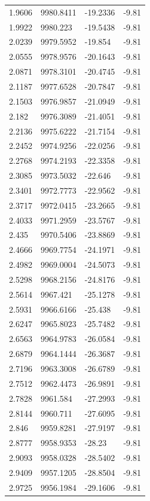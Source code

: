 \begin{table}[H]
\begin{tabular}{llll}
1.9606 & 9980.8411 & -19.2336 & -9.81 \\
1.9922 & 9980.223 & -19.5438 & -9.81 \\
2.0239 & 9979.5952 & -19.854 & -9.81 \\
2.0555 & 9978.9576 & -20.1643 & -9.81 \\
2.0871 & 9978.3101 & -20.4745 & -9.81 \\
2.1187 & 9977.6528 & -20.7847 & -9.81 \\
2.1503 & 9976.9857 & -21.0949 & -9.81 \\
2.182 & 9976.3089 & -21.4051 & -9.81 \\
2.2136 & 9975.6222 & -21.7154 & -9.81 \\
2.2452 & 9974.9256 & -22.0256 & -9.81 \\
2.2768 & 9974.2193 & -22.3358 & -9.81 \\
2.3085 & 9973.5032 & -22.646 & -9.81 \\
2.3401 & 9972.7773 & -22.9562 & -9.81 \\
2.3717 & 9972.0415 & -23.2665 & -9.81 \\
2.4033 & 9971.2959 & -23.5767 & -9.81 \\
2.435 & 9970.5406 & -23.8869 & -9.81 \\
2.4666 & 9969.7754 & -24.1971 & -9.81 \\
2.4982 & 9969.0004 & -24.5073 & -9.81 \\
2.5298 & 9968.2156 & -24.8176 & -9.81 \\
2.5614 & 9967.421 & -25.1278 & -9.81 \\
2.5931 & 9966.6166 & -25.438 & -9.81 \\
2.6247 & 9965.8023 & -25.7482 & -9.81 \\
2.6563 & 9964.9783 & -26.0584 & -9.81 \\
2.6879 & 9964.1444 & -26.3687 & -9.81 \\
2.7196 & 9963.3008 & -26.6789 & -9.81 \\
2.7512 & 9962.4473 & -26.9891 & -9.81 \\
2.7828 & 9961.584 & -27.2993 & -9.81 \\
2.8144 & 9960.711 & -27.6095 & -9.81 \\
2.846 & 9959.8281 & -27.9197 & -9.81 \\
2.8777 & 9958.9353 & -28.23 & -9.81 \\
2.9093 & 9958.0328 & -28.5402 & -9.81 \\
2.9409 & 9957.1205 & -28.8504 & -9.81 \\
2.9725 & 9956.1984 & -29.1606 & -9.81 \\

\end{tabular}
\end{table}
